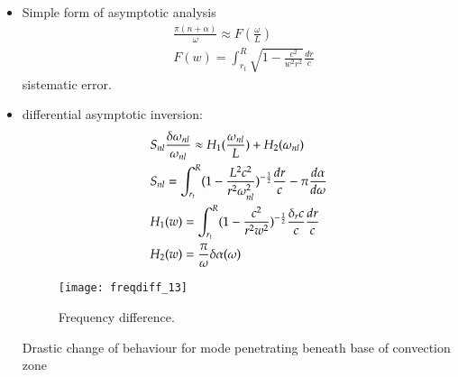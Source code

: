 \documentclass[oneside,12pt,fleqn]{memoir}
\begin{document}
{\begin{itemize}
    \item Simple form of asymptotic analysis
    \begin{align*}
    &\frac{\pi(n+\alpha)}{\omega}\approx F(\frac{\omega}{L})\\
    &F(w)=\int_{r_t}^R\sqrt{1-\frac{c^2}{w^2r^2}}\frac{dr}{c}
    \end{align*}
    sistematic error.
    \item differential asymptotic inversion:
    \begin{align*}
    &S_{nl}\frac{\delta\omega_{nl}}{\omega_{nl}}\approx H_1(\frac{\omega_{nl}}{L})+H_2(\omega_{nl})\\
    &S_{nl}=\int_{r_t}^R(1-\frac{L^2c^2}{r^2\omega_{nl}^2})^{-\frac{1}{2}}\frac{dr}{c}-\pi\frac{d \alpha}{d \omega}\\
    &H_1(w)=\int_{r_t}^R(1-\frac{c^2}{r^2w^2})^{-\frac{1}{2}}\frac{\delta_rc}{c}\frac{dr}{c}\\
    &H_2(w)=\frac{\pi}{\omega}\delta\alpha(\omega)
    \end{align*}
    
    \begin{figure}[!ht]
    \centering
    \texttt{[image: freqdiff\_13]}
    \caption{Frequency difference.}
    \end{figure}

    \clearpage
    
    Drastic change of behaviour for mode penetrating beneath base of convection zone
    

\end{itemize}}
\end{document}
